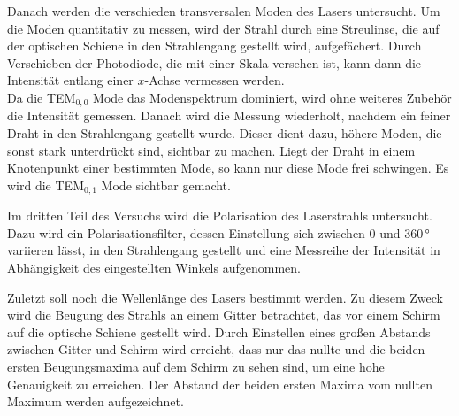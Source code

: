 Danach werden die verschieden transversalen Moden des Lasers untersucht. Um die Moden quantitativ zu messen, wird der Strahl durch eine Streulinse, die auf der optischen Schiene in den Strahlengang gestellt wird, aufgefächert. Durch Verschieben der Photodiode, die mit einer Skala versehen ist, kann dann die Intensität entlang einer $x$-Achse vermessen werden. \\
Da die TEM$_{\mathrm{0,0}}$ Mode das Modenspektrum dominiert, wird ohne weiteres Zubehör die Intensität gemessen. Danach wird die Messung wiederholt, nachdem ein feiner Draht in den Strahlengang gestellt wurde. Dieser dient dazu, höhere Moden, die sonst stark unterdrückt sind, sichtbar zu machen. Liegt der Draht in einem Knotenpunkt einer bestimmten Mode, so kann nur diese Mode frei schwingen. Es wird die TEM$_{\mathrm{0,1}}$ Mode sichtbar gemacht.

Im dritten Teil des Versuchs wird die Polarisation des Laserstrahls untersucht. Dazu wird ein Polarisationsfilter, dessen Einstellung sich zwischen 0 und 360$\,°$ variieren lässt, in den Strahlengang gestellt und eine Messreihe der Intensität in Abhängigkeit des eingestellten Winkels aufgenommen.

Zuletzt soll noch die Wellenlänge des Lasers bestimmt werden. Zu diesem Zweck wird die Beugung des Strahls an einem Gitter betrachtet, das vor einem Schirm auf die optische Schiene gestellt wird. Durch Einstellen eines großen Abstands zwischen Gitter und Schirm wird erreicht, dass nur das nullte und die beiden ersten Beugungsmaxima auf dem Schirm zu sehen sind, um eine hohe Genauigkeit zu erreichen. Der Abstand der beiden ersten Maxima vom nullten Maximum werden aufgezeichnet.
